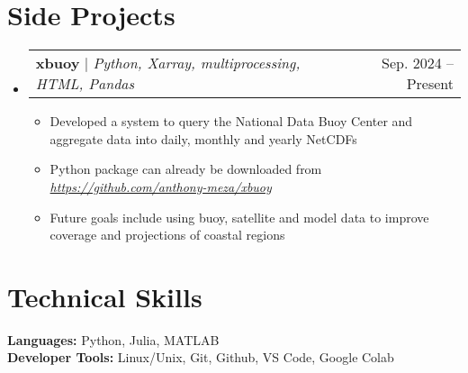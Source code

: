 \documentclass[letterpaper,11pt]{article}
\makeatletter
\newcommand{\resumeItem}[1]{
  \item\small{
    {#1 \vspace{-2pt}}
  }
}
\newcommand{\resumeProjectHeading}[2]{
    \item
    \begin{tabular*}{0.97\textwidth}{l@{\extracolsep{\fill}}r}
      \small#1 & #2 \\
    \end{tabular*}\vspace{-7pt}
}
\newcommand{\resumeSubHeadingListStart}{\begin{itemize}[leftmargin=0.15in, label={}]}
\newcommand{\resumeSubHeadingListEnd}{\end{itemize}}
\newcommand{\resumeItemListStart}{\begin{itemize}}
\newcommand{\resumeItemListEnd}{\end{itemize}\vspace{-5pt}}
\makeatother
\begin{document}
\section{Side Projects}
    \resumeSubHeadingListStart
      \resumeProjectHeading
          {\textbf{xbuoy} $|$ \emph{Python, Xarray, 
          multiprocessing, HTML, Pandas}}{Sep. 2024 -- Present}
          \resumeItemListStart
            \resumeItem{Developed a system to query the National Data Buoy Center and aggregate  data into daily, monthly and yearly NetCDFs}
            \resumeItem{Python package can already be downloaded from \textit{\url{https://github.com/anthony-meza/xbuoy}}}
            \resumeItem{Future goals include using buoy, satellite and model data to improve coverage and projections of coastal regions}
          \resumeItemListEnd
    \resumeSubHeadingListEnd



%
\section{Technical Skills}
 \begin{itemize}[leftmargin=0.15in, label={}]
    \small{\item{
     \textbf{Languages:}{ Python, Julia, MATLAB} \\
     \textbf{Developer Tools:}{ Linux/Unix, Git, Github, VS Code, Google Colab} \\
    }}
 \end{itemize}


\end{document}
